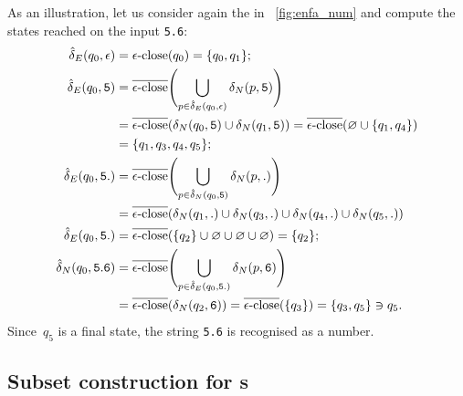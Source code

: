 As an illustration, let us consider again the \eNFA in
\fig~\vref{fig:enfa_num} and compute the states reached on the input
\verb+5.6+:
\begin{align*}
   \hat{\delta}_E (q_0, \epsilon)
&= \epsilon\text{-close} (q_0) = \{q_0, q_1\};\\
   \hat{\delta}_E (q_0, \mathtt{5})
&= \overline{\epsilon\text{-close}} \Biggl( \bigcup_{p \in \hat{\delta}_E (q_0,
   \epsilon)}{\delta_N (p, \mathtt{5})} \Biggr)\\
&= \overline{\epsilon\text{-close}} (\delta_N (q_0, \mathtt{5}) \cup \delta_N (q_1,
   \mathtt{5})) = \overline{\epsilon\text{-close}} (\varnothing \cup \{q_1, q_4\})\\
&= \{q_1, q_3, q_4, q_5\};\\
   \hat{\delta}_E (q_0, \mathtt{5.})
&= \overline{\epsilon\text{-close}} \Biggl( \bigcup_{p \in \hat{\delta}_N (q_0,
   \mathtt{5})}{\delta_N (p, \mathtt{.})} \Biggr)\\
&= \overline{\epsilon\text{-close}} (\delta_N (q_1, \mathtt{.}) \cup \delta_N (q_3,
   \mathtt{.}) \cup \delta_N (q_4, \mathtt{.}) \cup \delta_N (q_5,
   \mathtt{.}))\\
   \hat{\delta}_E (q_0, \mathtt{5.})
&= \overline{\epsilon\text{-close}} (\{q_2\} \cup \varnothing \cup \varnothing \cup
   \varnothing)
 = \{q_2\};\\
   \hat{\delta}_N (q_0, \mathtt{5.6})
&= \overline{\epsilon\text{-close}} \Biggl( \bigcup_{p \in \hat{\delta}_E (q_0,
     \mathtt{5.})}{\delta_N (p, \mathtt{6})} \Biggr)\\
&= \overline{\epsilon\text{-close}} (\delta_N (q_2, \mathtt{6}))
= \overline{\epsilon\text{-close}} (\{q_3\})
= \{q_3, q_5\} \ni q_5.
\end{align*}
Since~\(q_5\) is a final state, the string \verb+5.6+ is recognised as
a number.

\subsection*{Subset construction for \eNFA{}s}

